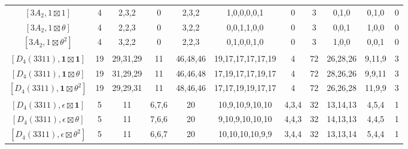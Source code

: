\begin{table}[ht]
\begin{adjustbox}{max width=\linewidth}
\begin{tabular}{|c|cccccccccc|}
        $[3A_2, 1\boxtimes1]$            & 4 & 2,3,2 & 0 & 2,3,2 & 1,0,0,0,0,1 & 0 & 3 & 0,1,0 & 0,1,0 & 0 \\ 
        $[3A_2, 1\boxtimes\theta]$       & 4 & 2,2,3 & 0 & 3,2,2 & 0,0,1,1,0,0 & 0 & 3 & 0,0,1 & 1,0,0 & 0 \\ 
        $[3A_2, 1\boxtimes\theta^2]$     & 4 & 3,2,2 & 0 & 2,2,3 & 0,1,0,0,1,0 & 0 & 3 & 1,0,0 & 0,0,1 & 0 \\ \hline

        $[D_4(3311),\mathbf{1}\boxtimes\mathbf{1}]$ & 19 & 29,31,29 & 11 & 46,48,46 & 19,17,17,17,17,19 & 4 & 72 & 26,28,26 & 9,11,9 & 3 \\
        $[D_4(3311),\mathbf{1}\boxtimes\theta]$ & 19 & 31,29,29 & 11 & 46,46,48 & 17,19,17,17,19,17 & 4 & 72 & 28,26,26 & 9,9,11 & 3 \\
        $[D_4(3311),\mathbf{1}\boxtimes\theta^2]$ & 19 & 29,29,31 & 11 & 48,46,46 & 17,17,19,19,17,17 & 4 & 72 & 26,26,28 & 11,9,9 & 3 \\
        $[D_4(3311),\epsilon\boxtimes\mathbf{1}]$ & 5 & 11 & 6,7,6 & 20 & 10,9,10,9,10,10 & 4,3,4 & 32 & 13,14,13 & 4,5,4 & 1 \\
        $[D_4(3311),\epsilon\boxtimes\theta]$ & 5 & 11 & 7,6,6 & 20 & 9,10,9,10,10,10 & 4,4,3 & 32 & 14,13,13 & 4,4,5 & 1 \\
        $[D_4(3311),\epsilon\boxtimes\theta^2]$ & 5 & 11 & 6,6,7 & 20 & 10,10,10,10,9,9 & 3,4,4 & 32 & 13,13,14 & 5,4,4 & 1  \\\hline

        \end{tabular}
        \end{adjustbox}
    \end{table}

    \iffalse
    \newpage

